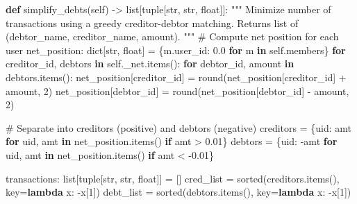 \documentclass[11pt]{article}
\newenvironment{Shaded}{\begin{snugshade}}{\end{snugshade}}
\newcommand{\BuiltInTok}[1]{\textcolor[rgb]{0.50,0.55,0.55}{#1}}
\newcommand{\CommentTok}[1]{\textcolor[rgb]{0.48,0.49,0.49}{#1}}
\newcommand{\ControlFlowTok}[1]{\textcolor[rgb]{0.99,0.74,0.29}{\textbf{#1}}}
\newcommand{\DecValTok}[1]{\textcolor[rgb]{0.96,0.45,0.00}{#1}}
\newcommand{\FloatTok}[1]{\textcolor[rgb]{0.96,0.45,0.00}{#1}}
\newcommand{\KeywordTok}[1]{\textcolor[rgb]{0.81,0.81,0.76}{\textbf{#1}}}
\newcommand{\NormalTok}[1]{\textcolor[rgb]{0.81,0.81,0.76}{#1}}
\newcommand{\OperatorTok}[1]{\textcolor[rgb]{0.81,0.81,0.76}{#1}}
\newcommand{\VariableTok}[1]{\textcolor[rgb]{0.15,0.68,0.68}{#1}}
\begin{document}
\begin{Shaded}
\begin{Highlighting}[]
    \KeywordTok{def}\NormalTok{ simplify\_debts(}\VariableTok{self}\NormalTok{) }\OperatorTok{{-}\textgreater{}} \BuiltInTok{list}\NormalTok{[}\BuiltInTok{tuple}\NormalTok{[}\BuiltInTok{str}\NormalTok{, }\BuiltInTok{str}\NormalTok{, }\BuiltInTok{float}\NormalTok{]]:}
        \CommentTok{"""}
\CommentTok{        Minimize number of transactions using a greedy creditor{-}debtor matching.}
\CommentTok{        Returns list of (debtor\_name, creditor\_name, amount).}
\CommentTok{        """}
        \CommentTok{\# Compute net position for each user}
\NormalTok{        net\_position: }\BuiltInTok{dict}\NormalTok{[}\BuiltInTok{str}\NormalTok{, }\BuiltInTok{float}\NormalTok{] }\OperatorTok{=}\NormalTok{ \{m.user\_id: }\FloatTok{0.0} \ControlFlowTok{for}\NormalTok{ m }\KeywordTok{in} \VariableTok{self}\NormalTok{.members\}}
        \ControlFlowTok{for}\NormalTok{ creditor\_id, debtors }\KeywordTok{in} \VariableTok{self}\NormalTok{.\_net.items():}
            \ControlFlowTok{for}\NormalTok{ debtor\_id, amount }\KeywordTok{in}\NormalTok{ debtors.items():}
\NormalTok{                net\_position[creditor\_id] }\OperatorTok{=} \BuiltInTok{round}\NormalTok{(net\_position[creditor\_id] }\OperatorTok{+}\NormalTok{ amount, }\DecValTok{2}\NormalTok{)}
\NormalTok{                net\_position[debtor\_id] }\OperatorTok{=} \BuiltInTok{round}\NormalTok{(net\_position[debtor\_id] }\OperatorTok{{-}}\NormalTok{ amount, }\DecValTok{2}\NormalTok{)}

        \CommentTok{\# Separate into creditors (positive) and debtors (negative)}
\NormalTok{        creditors }\OperatorTok{=}\NormalTok{ \{uid: amt }\ControlFlowTok{for}\NormalTok{ uid, amt }\KeywordTok{in}\NormalTok{ net\_position.items() }\ControlFlowTok{if}\NormalTok{ amt }\OperatorTok{\textgreater{}} \FloatTok{0.01}\NormalTok{\}}
\NormalTok{        debtors }\OperatorTok{=}\NormalTok{ \{uid: }\OperatorTok{{-}}\NormalTok{amt }\ControlFlowTok{for}\NormalTok{ uid, amt }\KeywordTok{in}\NormalTok{ net\_position.items() }\ControlFlowTok{if}\NormalTok{ amt }\OperatorTok{\textless{}} \OperatorTok{{-}}\FloatTok{0.01}\NormalTok{\}}

\NormalTok{        transactions: }\BuiltInTok{list}\NormalTok{[}\BuiltInTok{tuple}\NormalTok{[}\BuiltInTok{str}\NormalTok{, }\BuiltInTok{str}\NormalTok{, }\BuiltInTok{float}\NormalTok{]] }\OperatorTok{=}\NormalTok{ []}
\NormalTok{        cred\_list }\OperatorTok{=} \BuiltInTok{sorted}\NormalTok{(creditors.items(), key}\OperatorTok{=}\KeywordTok{lambda}\NormalTok{ x: }\OperatorTok{{-}}\NormalTok{x[}\DecValTok{1}\NormalTok{])}
\NormalTok{        debt\_list }\OperatorTok{=} \BuiltInTok{sorted}\NormalTok{(debtors.items(), key}\OperatorTok{=}\KeywordTok{lambda}\NormalTok{ x: }\OperatorTok{{-}}\NormalTok{x[}\DecValTok{1}\NormalTok{])}


\end{Highlighting}
\end{Shaded}
\end{document}
